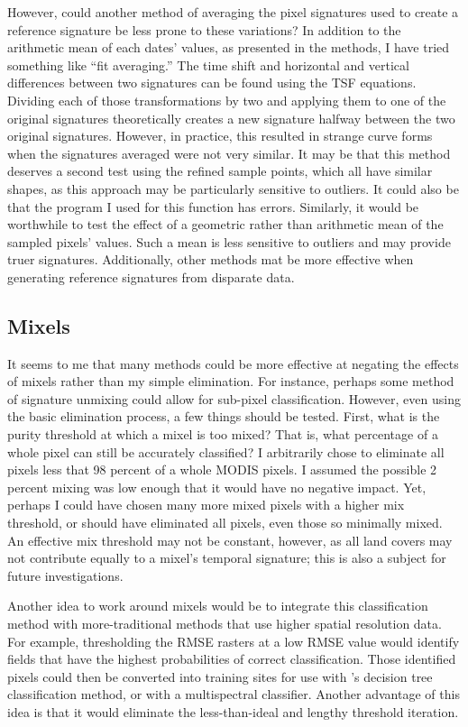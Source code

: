 However, could another method of averaging the pixel signatures used to create a reference signature be less prone to these variations? In addition to the arithmetic mean of each dates' values, as presented in the methods, I have tried something like “fit averaging.” The time shift and horizontal and vertical differences between two signatures can be found using the TSF equations. Dividing each of those transformations by two and applying them to one of the original signatures theoretically creates a new signature halfway between the two original signatures. However, in practice, this resulted in strange curve forms when the signatures averaged were not very similar. It may be that this method deserves a second test using the refined sample points, which all have similar shapes, as this approach may be particularly sensitive to outliers. It could also be that the program I used for this function has errors. Similarly, it would be worthwhile to test the effect of a geometric rather than arithmetic mean of the sampled pixels’ values. Such a mean is less sensitive to outliers and may provide truer signatures. Additionally, other methods mat be more effective when generating reference signatures from disparate data. 

\subsection{Mixels}

It seems to me that many methods could be more effective at negating the effects of mixels rather than my simple elimination. For instance, perhaps some method of signature unmixing could allow for sub-pixel classification. However, even using the basic elimination process, a few things should be tested. First, what is the purity threshold at which a mixel is too mixed? That is, what percentage of a whole pixel can still be accurately classified? I arbitrarily chose to eliminate all pixels less that 98 percent of a whole MODIS pixels. I assumed the possible 2 percent mixing was low enough that it would have no negative impact. Yet, perhaps I could have chosen many more mixed pixels with a higher mix threshold, or should have eliminated all pixels, even those so minimally mixed. An effective mix threshold may not be constant, however, as all land covers may not contribute equally to a mixel's temporal signature; this is also a subject for future investigations.

Another idea to work around mixels would be to integrate this classification method with more-traditional methods that use higher spatial resolution data. For example, thresholding the RMSE rasters at a low RMSE value would identify fields that have the highest probabilities of correct classification. Those identified pixels could then be converted into training sites for use with \citeauthor{wardlow2005state-level}'s decision tree classification method, or with a multispectral classifier. Another advantage of this idea is that it would eliminate the less-than-ideal and lengthy threshold iteration.

